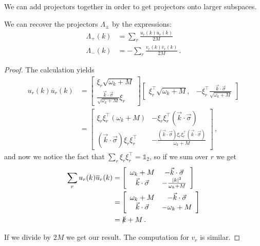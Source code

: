 \documentclass[main.tex]{subfiles}
\begin{document}
We can add projectors together in order to get projectors onto larger subspaces.

\begin{claim}
We can recover the projectors \(\Lambda_{\pm }\) by the expressions: 
%
\begin{align}
\Lambda_{+} (k) &= \sum_{r} \frac{u_r(k) \overline{u}_{r} (k)}{2M} \\
\Lambda_{-} (k) &= - \sum_{r} \frac{v_r(k) \overline{v}_{r} (k)}{2M} 
\,.
\end{align}
\end{claim}

\begin{proof}
The calculation yields 
%
\begin{align}
u_r(k) \overline{u}_{r}(k) &=
\left[\begin{array}{c}
\xi_{r}\sqrt{\omega_{k} + M} \\ 
\displaystyle
\frac{\vec{k} \cdot \vec{\sigma}}{\sqrt{\omega_{k} + M}} 
\xi_{r}
\end{array}\right]
\left[\begin{array}{cc}
\xi_{r}^{\top} \sqrt{\omega_{k} + M}, & 
\displaystyle
- \xi_{r}^{\top} \frac{\vec{k} \cdot \vec{\sigma}}{\sqrt{\omega_{k} + M}}
\end{array}\right]  \\
&= \left[\begin{array}{cc}
\xi_{r} \xi_{r}^{\top} (\omega_{k} + M) & - \xi_{r} \xi_{r}^{\top} (\vec{k} \cdot \vec{\sigma}) \\ 
(\vec{k} \cdot \vec{\sigma}) \xi_{r} \xi_{r}^{\top} & 
- \frac{ (\vec{k}\cdot \vec{\sigma}) \xi_{r} \xi_{r}^{\top} (\vec{k} \cdot \vec{\sigma})}{\omega_{k} + M}
\end{array}\right]
\,,
\end{align}
%
and now we notice the fact that \(\sum _{r} \xi_{r} \xi_{r} ^{\top} = \mathbb{1}_{2}\), so if we sum over \(r\) we get 
%
\begin{align}
\sum _{r} u_r (k) \overline{u}_{r}(k) &=
\left[\begin{array}{cc}
\omega_{k} + M & - \vec{k} \cdot \vec{\sigma} \\ 
\vec{k} \cdot \vec{\sigma} & - \frac{\abs{k}^2}{\omega_{k} + M}
\end{array}\right]  \\
&= \left[\begin{array}{cc}
\omega_{k} + M & - \vec{k} \cdot \vec{\sigma} \\ 
\vec{k} \cdot \vec{\sigma} & - \omega_{k} + M
\end{array}\right]  \\
&= \slashed{k} + M
\,.
\end{align}

If we divide by \(2M\) we get our result. 
The computation for \(v_{r}\) is similar. 
\end{proof}
\end{document}
